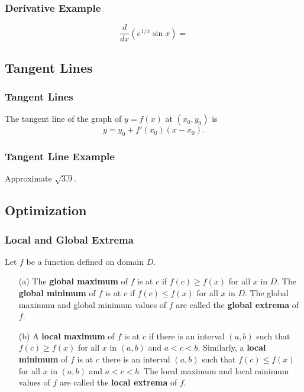 \documentclass{beamer}
\begin{document}
\begin{frame}[t]
\frametitle{Derivative Example}
\begin{Example}
$$
\frac{d}{dx}\left(e^{1/x}\sin x\right) = 
$$
\end{Example}

\end{frame}

\subsection{Tangent Lines}


\begin{frame}
\frametitle{Tangent Lines}
The tangent line of the graph of $y = f(x)$ at $(x_0, y_0)$ is
$$
y = y_0 + f'(x_0)(x - x_0).
$$
\end{frame}

\begin{frame}[t]
\frametitle{Tangent Line Example}
\begin{Example}
Approximate $\sqrt{3.9}$.
\end{Example}

\end{frame}


\subsection{Optimization}

\begin{frame}
\frametitle{Local and Global Extrema}

\begin{Definition}
Let $f$ be a function defined on domain $D$.\small
\begin{enumerate}
\item[(a)] The {\bf global maximum} of $f$ is at $c$ if $f(c)\geq f(x)$ for all $x$ in $D$. The {\bf global minimum} of $f$ is at $c$ if $f(c) \leq f(x)$ for all $x$ in $D$. The global maximum and global minimum values of $f$ are called the {\bf global extrema} of $f$.
\item[(b)] A {\bf local maximum} of $f$ is at $c$ if there is an interval $(a, b)$ such that $f(c) \geq f(x)$ for all $x$ in $(a, b)$ and $a < c < b$. Similarly, a {\bf local minimum} of $f$ is at $c$ there is an interval $(a, b)$ such that $f(c) \leq f(x)$ for all $x$ in $(a, b)$ and $a < c < b$. The local maximum and local minimum values of $f$ are called the {\bf local extrema} of $f$.
\end{enumerate}
\end{Definition}
\end{frame}
\end{document}
